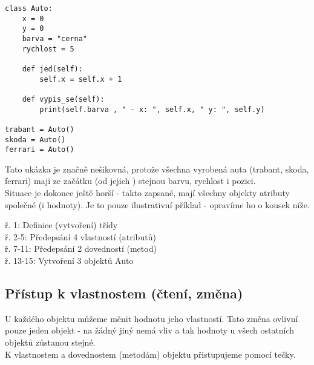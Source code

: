 \begin{minipage}[t]{.45\textwidth}
\begin{code}
\begin{verbatim}
class Auto:
	x = 0
	y = 0
	barva = "cerna"
	rychlost = 5
	
	def jed(self):
		self.x = self.x + 1
		
	def vypis_se(self):
		print(self.barva , " - x: ", self.x, " y: ", self.y)
		
trabant = Auto()
skoda = Auto()
ferrari = Auto()
\end{verbatim}

\label{code:trida-prvni_nesikovna}
\end{code}
\end{minipage}
\begin{minipage}[t]{.45\textwidth}
Tato ukázka je značně nešikovná, protože všechna vyrobená auta (trabant, skoda, ferrari) maji ze začátku (od jejich ) stejnou barvu, rychlost i pozici.\\Situace je dokonce ještě horší - takto zapsané, mají všechny objekty atributy společné (i hodnoty). Je to pouze ilustrativní příklad - opravíme ho o kousek níže.\\
\vspace{2cm}

ř. 1:	Definice (vytvoření) třídy\\
ř. 2-5:	Předepsání 4 vlastností (atributů)\\
ř. 7-11:	Předepsání 2 dovedností (metod)\\
ř. 13-15:	Vytvoření 3 objektů Auto
\end{minipage}

\subsection{Přístup k vlastnostem (čtení, změna)}
U každého objektu můžeme měnit hodnotu jeho vlastností. Tato změna ovlivní pouze jeden objekt - na žádný jiný nemá vliv a tak hodnoty u všech ostatních objektů zůstanou stejné.\\
K vlastnostem a dovednostem (metodám) objektu přistupujeme pomocí tečky.\\

